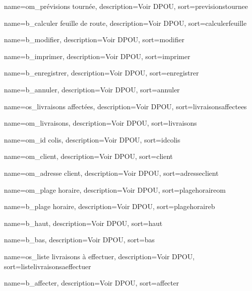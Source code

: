 {
	name={om\_prévisions tournée},
	description={Voir \textsc{DPOU}},
	sort={previsionstournee}
}

{
	name={b\_calculer feuille de route},
	description={Voir \textsc{DPOU}},
	sort={calculerfeuille}
}

{
	name={b\_modifier},
	description={Voir \textsc{DPOU}},
	sort={modifier}
}

{
	name={b\_imprimer},
	description={Voir \textsc{DPOU}},
	sort={imprimer}
}

{
	name={b\_enregistrer},
	description={Voir \textsc{DPOU}},
	sort={enregistrer}
}

{
	name={b\_annuler},
	description={Voir \textsc{DPOU}},
	sort={annuler}
}

{
	name={os\_livraisons affectées},
	description={Voir \textsc{DPOU}},
	sort={livraisonsaffectees}
}

{
	name={om\_livraisons},
	description={Voir \textsc{DPOU}},
	sort={livraisons}
}

{
	name={om\_id colis},
	description={Voir \textsc{DPOU}},
	sort={idcolis}
}

{
	name={om\_client},
	description={Voir \textsc{DPOU}},
	sort={client}
}

{
	name={om\_adresse client},
	description={Voir \textsc{DPOU}},
	sort={adresseclient}
}

{
	name={om\_plage horaire},
	description={Voir \textsc{DPOU}},
	sort={plagehoraireom}
}

{
	name={b\_plage horaire},
	description={Voir \textsc{DPOU}},
	sort={plagehoraireb}
}

{
	name={b\_haut},
	description={Voir \textsc{DPOU}},
	sort={haut}
}

{
	name={b\_bas},
	description={Voir \textsc{DPOU}},
	sort={bas}
}

{
	name={os\_liste livraisons à effectuer},
	description={Voir \textsc{DPOU}},
	sort={listelivraisonsaeffectuer}
}

{
	name={b\_affecter},
	description={Voir \textsc{DPOU}},
	sort={affecter}
}

